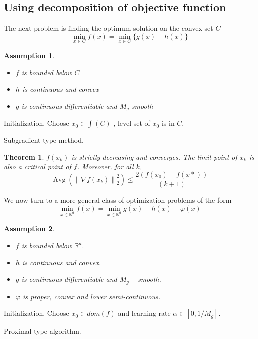 \documentclass{article}
\DeclareMathOperator{\Avg}{Avg}
\theoremstyle{theorem}
\newtheorem{theorem}{Theorem}
\newtheorem*{assumption}{Assumption}
\theoremstyle{definition}
\begin{document}
 \subsection{Using decomposition of objective function}
 The next problem is finding the optimum solution on the convex set $C$
 $$\min_{x \in C} f(x) = \min_{x \in C} \{ g(x)-h(x) \} $$
 \begin{assumption}
 \begin{itemize}
 	\item $f$ is bounded below $C$
 	\item $h$ is continuous and convex
 	\item $g$ is continuous differentiable and $M_g$ smooth
 \end{itemize} \end{assumption}
\begin{algorithm}[H]
	\SetAlgoLined \DontPrintSemicolon
	Initialization. Choose $x_0 \in \int(C)$ , level set of $x_0$ is in $C$. \;
	\caption{Subgradient-type method.}
\end{algorithm}
\begin{theorem}\cite{khamaru2018convergence}
$f(x_k)$ is strictly decreasing and converges. The limit point of $x_k$ is also a critical point of $f$. Moreover, for all $k$, $$\Avg \left(\left\|\nabla f(x_k)\right\|^2_2 \right) \leq \frac{2(f(x_0)-f(x*))}{(k+1)}$$ \end{theorem}
We now turn to a more general class of optimization problems of the form
$$\min_{x \in \mathbb{R}^d} f(x) = \min_{x \in \mathbb{R}^d} g(x)-h(x)+ \varphi(x)$$
\begin{assumption}
	\begin{itemize}
		\item $f$ is bounded below $\mathbb{R}^d$.
		\item $h$ is continuous and convex.
		\item $g$ is continuous differentiable and $M_g-$smooth.
		\item $\varphi$ is proper, convex and lower semi-continuous.
\end{itemize} \end{assumption}
\begin{algorithm}[H]
	\SetAlgoLined \DontPrintSemicolon
	Initialization. Choose $x_0 \in dom(f)$ and learning rate $\alpha \in \left[0, 1/M_g\right]$. \;
	\caption{Proximal-type algorithm.}
\end{algorithm}
\end{document}

